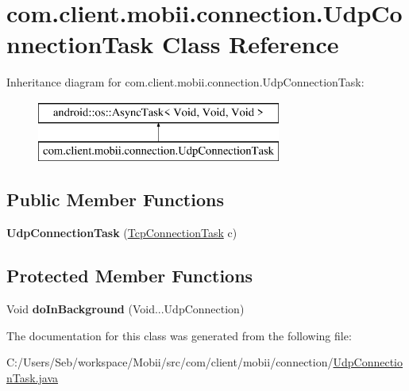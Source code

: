 \hypertarget{classcom_1_1client_1_1mobii_1_1connection_1_1_udp_connection_task}{\section{com.\-client.\-mobii.\-connection.\-Udp\-Connection\-Task Class Reference}
\label{classcom_1_1client_1_1mobii_1_1connection_1_1_udp_connection_task}
}
Inheritance diagram for com.\-client.\-mobii.\-connection.\-Udp\-Connection\-Task\-:\begin{figure}[H]
\begin{center}
\leavevmode
\includegraphics[height=2.000000cm]{classcom_1_1client_1_1mobii_1_1connection_1_1_udp_connection_task}
\end{center}
\end{figure}
\subsection*{Public Member Functions}
\begin{DoxyCompactItemize}
\item 
\hypertarget{classcom_1_1client_1_1mobii_1_1connection_1_1_udp_connection_task_a4a24d7132c4368f879404a22e854a2a2}{{\bfseries Udp\-Connection\-Task} (\hyperlink{classcom_1_1client_1_1mobii_1_1connection_1_1_tcp_connection_task}{Tcp\-Connection\-Task} c)}\label{classcom_1_1client_1_1mobii_1_1connection_1_1_udp_connection_task_a4a24d7132c4368f879404a22e854a2a2}

\end{DoxyCompactItemize}
\subsection*{Protected Member Functions}
\begin{DoxyCompactItemize}
\item 
\hypertarget{classcom_1_1client_1_1mobii_1_1connection_1_1_udp_connection_task_a30c33f8407e335c7cccf6e347558630f}{Void {\bfseries do\-In\-Background} (Void...\-Udp\-Connection)}\label{classcom_1_1client_1_1mobii_1_1connection_1_1_udp_connection_task_a30c33f8407e335c7cccf6e347558630f}

\end{DoxyCompactItemize}


The documentation for this class was generated from the following file\-:\begin{DoxyCompactItemize}
\item 
C\-:/\-Users/\-Seb/workspace/\-Mobii/src/com/client/mobii/connection/\hyperlink{_udp_connection_task_8java}{Udp\-Connection\-Task.\-java}\end{DoxyCompactItemize}
